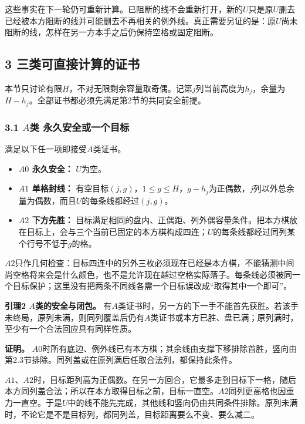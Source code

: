 \documentclass[
  a4paper,
]{article}
\providecommand{\tightlist}{%
  \setlength{\itemsep}{0pt}\setlength{\parskip}{0pt}}
\begin{document}
这些事实在下一轮仍可重新计算。已阻断的线不会重新打开，新的\(U\)只是原\(U\)删去已经被本方阻断的线并可能删去不再相关的例外线。真正需要另证的是：原\(U\)尚未阻断的线，怎样在另一方本手之后仍保持空格或固定阻断。

\subsection{3
三类可直接计算的证书}\label{ux4e09ux7c7bux53efux76f4ux63a5ux8ba1ux7b97ux7684ux8bc1ux4e66}

本节只讨论有限\(H\)，不对无限剩余容量取奇偶。记第\(j\)列当前高度为\(h_j\)，余量为\(H-h_j\)。全部证书都必须先满足第2节的共同安全前提。

\subsubsection{\texorpdfstring{3.1 \(A\)类
永久安全或一个目标}{3.1 A类 永久安全或一个目标}}\label{aux7c7b-ux6c38ux4e45ux5b89ux5168ux6216ux4e00ux4e2aux76eeux6807}

满足以下任一项即接受\(A\)类证书。

\begin{itemize}
\tightlist
\item
  \textbf{\(A0\) 永久安全：} \(U\)为空。
\item
  \textbf{\(A1\) 单格封线：}
  有空目标\((j,g)\)，\(1\le g\le H\)，\(g-h_j\)为正偶数，\(j\)列以外总余量为偶数，而且\(U\)的每条线都经过\((j,g)\)。
\item
  \textbf{\(A2\) 下方先胜：}
  目标满足相同的盘内、正偶距、列外偶容量条件。把本方棋放在目标上，会与三个当前已固定的本方棋构成四连；\(U\)的每条线都经过同列某个行号不低于\(g\)的格。
\end{itemize}

\(A2\)只作几何检查：目标四连中的另外三枚必须现在已经是本方棋，不能猜测中间尚空格将来会是什么颜色，也不是允许现在越过空格实际落子。每条线必须被同一个目标保护；这里没有把两条不同线各需一个目标误改成``取得其中一个即可''。

\textbf{引理2 \(A\)类的安全与闭包。}
有\(A\)类证书时，另一方的下一手不能首先获胜。若该手未终局，原列未满，则同列覆盖后仍有\(A\)类证书或本方已胜、盘已满；原列满时，至少有一个合法回应具有同样性质。

\textbf{证明。}
\(A0\)时所有底边、例外线已有本方棋；其余线由支撑下移排除首胜，竖向由第2.3节排除。同列盖或在原列满后任取合法列，都保持此条件。

\(A1\)、\(A2\)时，目标距列高为正偶数。在另一方回合，它最多走到目标下一格，随后本方同列盖合法；所以在本方取得目标之前，目标一直空。\(A2\)同列更高格也因重力一直空。于是\(U\)中的线不能先完成，其他线和竖向仍由共同条件排除。原列未满时，不论它是不是目标列，都同列盖，目标距离要么不变、要么减二。
\end{document}
